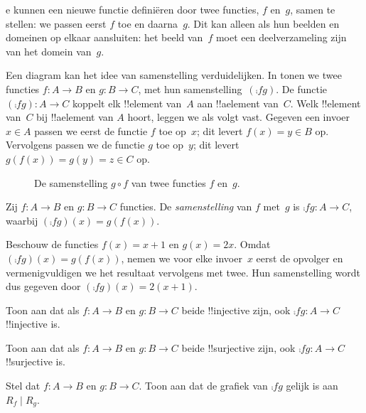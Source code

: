 \documentclass[../../../include/open-logic-section]{subfiles}
\begin{document}

\begin{explain}
e kunnen een nieuwe
functie definiëren door twee functies, $f$ en~$g$, samen te stellen:
we passen eerst $f$ toe en daarna~$g$. Dit kan alleen als hun beelden
en domeinen op elkaar aansluiten: het beeld van~$f$ moet een
deelverzameling zijn van het domein van~$g$.

Een diagram kan het idee van samenstelling verduidelijken. In
 tonen we twee functies $f \colon A \to B$ en
$g \colon B \to C$, met hun samenstelling~$(\comp{f}{g})$. De functie
$(\comp{f}{g}) \colon A \to C$ koppelt elk !!{element} van~$A$ aan
!!a{element} van~$C$. Welk !!{element} van~$C$ bij !!a{element} van
$A$ hoort, leggen we als volgt vast. Gegeven een invoer $x \in A$
passen we eerst de functie $f$ toe op~$x$; dit levert $f(x) = y \in B$
op. Vervolgens passen we de functie $g$ toe op~$y$; dit levert
$g(f(x)) = g(y) = z \in C$ op.
\begin{figure}
  \caption{De samenstelling $g \circ f$ van twee functies $f$ en~$g$.}
\end{figure}
\end{explain}

\begin{defn}[Samenstelling]
Zij $f\colon A \to B$ en $g\colon B \to C$ functies. De
\emph{samenstelling} van $f$ met~$g$ is $\comp{f}{g} \colon A \to C$,
waarbij $(\comp{f}{g})(x) = g(f(x))$.
\end{defn}

\begin{ex}
Beschouw de functies $f(x) = x + 1$ en $g(x) = 2x$. Omdat
$(\comp{f}{g})(x) = g(f(x))$, nemen we voor elke invoer~$x$ eerst de
opvolger en vermenigvuldigen we het resultaat vervolgens met twee. Hun
samenstelling wordt dus gegeven door $(\comp{f}{g})(x) = 2(x+1)$.
\end{ex}

\begin{prob}
Toon aan dat als $f \colon A \to B$ en $g \colon B \to C$ beide
!!{injective} zijn, ook $\comp{f}{g}\colon A \to C$ !!{injective} is.
\end{prob}

\begin{prob}
Toon aan dat als $f \colon A \to B$ en $g \colon B \to C$ beide
!!{surjective} zijn, ook $\comp{f}{g}\colon A \to C$ !!{surjective}
is.
\end{prob}

\begin{prob}
Stel dat $f \colon A \to B$ en $g \colon B \to C$. Toon aan dat de
grafiek van $\comp{f}{g}$ gelijk is aan $R_f \mid R_g$.
\end{prob}
\end{document}
